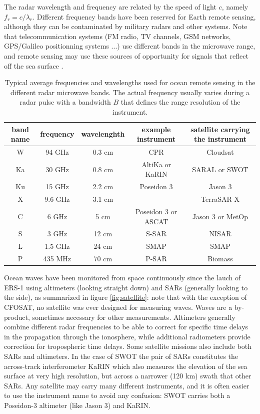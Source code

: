 The radar wavelength 
and frequency are related by the speed of light $c$, namely $f_r = c / \lambda_r$. Different frequency bands have been reserved for Earth remote sensing, although they can be contaminated by military radars and other 
systems. Note that telecommunication systems (FM radio, TV channels, GSM networks, GPS/Galileo positionning systems ...) use different bands in the microwave range, and remote sensing may use these sources of opportunity for signals that reflect off the sea surface  \citep[e.g.][]{Lowe&al.2002}.
\begin{table}[hb]
  \centering
  \begin{tabular}{|c|c|c|c| c |}
 \hline
band name & frequency & wavelenghth & example instrument & satellite  carrying the instrument  \\
 \hline
W  & 94 GHz  & 0.3 cm & CPR & Cloudsat  \\
Ka & 30 GHz  & 0.8 cm & AltiKa or KaRIN & SARAL or SWOT  \\
Ku & 15 GHz  & 2.2 cm & Poseidon 3 & Jason 3  \\
X &  9.6 GHz & 3.1 cm & & TerraSAR-X  \\
C & 6 GHz   & 5 cm & Poseidon 3 or ASCAT & Jason 3 or MetOp \\
S & 3 GHz   & 12 cm & S-SAR &  NISAR \\
L & 1.5 GHz  & 24 cm & SMAP  & SMAP \\
P & 435 MHz  & 70 cm & P-SAR & Biomass \\
\hline
\end{tabular}
\caption{Typical average frequencies and wavelengths used for ocean remote sensing in the different radar microwave bands. The actual frequency usually varies during a radar pulse with a bandwidth $B$ that defines 
the range resolution of the instrument. \label{table_radars}}
\label{table_bands}
\end{table}
Ocean waves have been monitored from space continuously since the lauch of ERS-1 using altimeters (looking straight down)  and SARs (generally looking to the side), as summarized in figure \ref{fig:satellite}: note that with the exception of CFOSAT, no satellite was ever designed for measuring waves. Waves are a by-product, sometimes necessary for other measurements. Altimeters generally combine different radar frequencies to be able to correct for specific time delays in the propagation through the ionosphere, while additional radiometers provide correction for tropospheric time delays.  Some satellite missions also include both SARs and altimeters. In the case of SWOT the pair of SARs constitutes the across-track interferometer KaRIN which also measures the elevation of the sea surface at very high resolution, but across a narrower (120 km) swath that other SARs. Any satellite may carry many different instruments, and it is often easier to use the instrument name to avoid any confusion: SWOT carries both a Poseidon-3 altimeter (like Jason 3) and KaRIN. 


